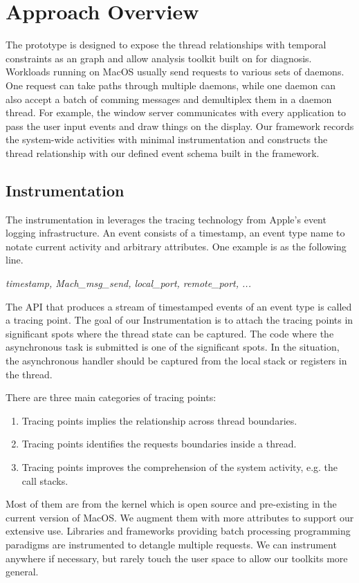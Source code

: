 \section{Approach Overview}
The \xxx prototype is designed to expose the thread relationships with temporal constraints as an graph and allow analysis toolkit built on for diagnosis.
Workloads running on MacOS usually send requests to various sets of daemons.
One request can take paths through multiple daemons, while one daemon can also accept a batch of comming messages and demultiplex them in a daemon thread.
For example, the window server communicates with every application to pass the user input events and draw things on the display.
Our framework records the system-wide activities with minimal instrumentation and constructs the thread relationship with our defined event schema built in the framework.

\subsection{Instrumentation}
The instrumentation in \xxx leverages the tracing technology from Apple's event logging infrastructure.
An event consists of a timestamp, an event type name to notate current activity and arbitrary attributes.
One example is as the following line.

\textit{timestamp, Mach\_msg\_send, local\_port, remote\_port, ...}

The API that produces a stream of timestamped events of an event type is called a tracing point.
The goal of our Instrumentation is to attach the tracing points in significant spots where the thread state can be captured.
The code where the asynchronous task is submitted is one of the significant spots.
In the situation, the asynchronous handler should be captured from the local stack or registers in the thread.

There are three main categories of tracing points:
\begin {enumerate}
	\item Tracing points implies the relationship across thread boundaries.
	\item Tracing points identifies the requests boundaries inside a thread.
	\item Tracing points improves the comprehension of the system activity, e.g. the call stacks.
\end{enumerate}

Most of them are from the kernel which is open source and pre-existing in the current version of MacOS.
We augment them with more attributes to support our extensive use.
Libraries and frameworks providing batch processing programming paradigms are instrumented to detangle multiple requests.
We can instrument anywhere if necessary, but rarely touch the user space to allow our toolkits more general.


